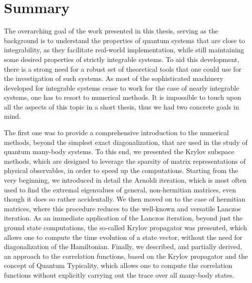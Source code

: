 \chapter{Summary}
\thispagestyle{chapterBeginStyle}


The overarching goal of the work presented in this thesis, serving as the background is to understand the properties of
quantum systems that are close to integrability, as they facilitate real-world implementation, while
still maintaining some desired properties of strictly integrable systems.
To aid this development, there is a strong need for a robust set of theoretical tools that one
could use for the investigation of such systems. As most of the sophisticated machinery developed
for integrable systems cease to work for the case of nearly integrable systems, one has
to resort to numerical methods. It is impossible to touch upon all the aspects of this
topic in a short thesis, thus we had two concrete goals in mind.

The first one was to provide a comprehensive introduction to the numerical methods, beyond the simplest exact
diagonalization, that are used in the study of quantum many-body systems. To this end, we presented
the Krylov subspace methods, which are designed to leverage the sparsity of matrix representations of
physical observables, in order to speed up the computations. Starting from the very beginning, we
introduced in detail the Arnoldi iteration, which is most often used to find the extremal eigenvalues
of general, non-hermitian matrices, even though it does so rather accidentally. We then moved on to
the case of hermitian matrices, where this procedure reduces to the well-known and versatile
Lanczos iteration. As an immediate application of the Lanczos iteration, beyond just the ground state
computations, the so-called Krylov propagator was presented, which allows one to compute the time evolution of
a state vector, without the need for diagonalization of the Hamiltonian. Finally, we described,
and partially derived, an approach to the correlation functions, based on the Krylov
propagator and the concept of Quantum Typicality, which allows one to compute the correlation functions
without explicitly carrying out the trace over all many-body states.

